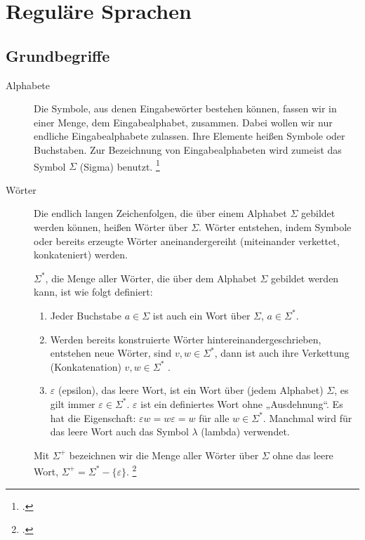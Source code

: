 \documentclass{bschlangaul-haupt}
\begin{document}

\chapter{Reguläre Sprachen}

%

\section{Grundbegriffe}

\begin{description}
\item[Alphabete]

Die Symbole, aus denen Eingabewörter bestehen können, fassen wir in
einer Menge, dem Eingabealphabet, zusammen. Dabei wollen wir nur
endliche Eingabealphabete zulassen. Ihre Elemente heißen Symbole oder
Buchstaben. Zur Bezeichnung von Eingabealphabeten wird zumeist das
Symbol $\Sigma$ (Sigma) benutzt.
\footcite[Seite 15]{vossen}

\item[Wörter]
Die endlich langen Zeichenfolgen, die über einem Alphabet $\Sigma$
gebildet werden können, heißen Wörter über $\Sigma$. Wörter entstehen,
indem Symbole oder bereits erzeugte Wörter aneinandergereiht
(miteinander verkettet, konkateniert) werden.

$\Sigma^*$, die Menge aller Wörter, die über dem Alphabet $\Sigma$
gebildet werden kann, ist wie folgt definiert:

\begin{enumerate}
\item Jeder Buchstabe $a \in \Sigma$ ist auch ein Wort über $\Sigma$,
\dh $a \in \Sigma^*$.

\item Werden bereits konstruierte Wörter hintereinandergeschrieben,
entstehen neue Wörter, \dh sind $v, w \in \Sigma^*$, dann ist auch ihre
Verkettung (Konkatenation) $v, w \in \Sigma^*$ .

\item $\varepsilon$ (epsilon), das leere Wort, ist ein Wort über (jedem
Alphabet) $\Sigma$, \dh es gilt immer $\varepsilon \in \Sigma^*$.
$\varepsilon$ ist ein definiertes Wort ohne „Ausdehnung“. Es hat die
Eigenschaft: $\varepsilon w = w \varepsilon = w$ für alle $w \in
\Sigma^*$. Manchmal wird für das leere Wort auch das Symbol $\lambda$
(lambda) verwendet.
\end{enumerate}

Mit $\Sigma^+$ bezeichnen wir die Menge aller Wörter über $\Sigma$ ohne
das leere Wort, \dh $\Sigma^+ = \Sigma^* - \{ \varepsilon \}$.
\footcite[Seite 16]{vossen}
\end{description}
\end{document}
